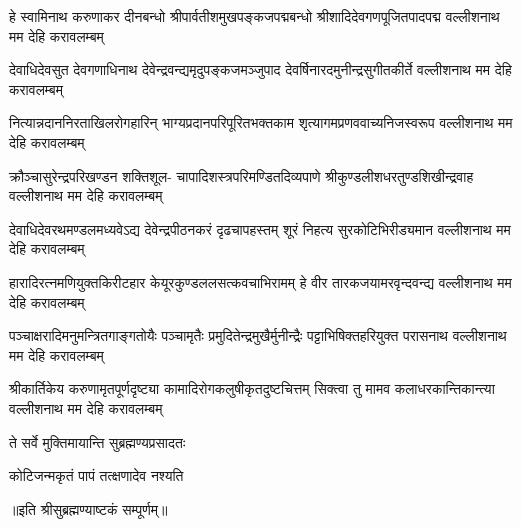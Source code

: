 

\fourlineindentedshloka
{हे स्वामिनाथ करुणाकर दीनबन्धो}
{श्रीपार्वतीशमुखपङ्कजपद्मबन्धो}
{श्रीशादिदेवगणपूजितपादपद्म}
{वल्लीशनाथ मम देहि करावलम्बम्} %

\fourlineindentedshloka
{देवाधिदेवसुत देवगणाधिनाथ}
{देवेन्द्रवन्द्यमृदुपङ्कजमञ्जुपाद}
{देवर्षिनारदमुनीन्द्रसुगीतकीर्ते}
{वल्लीशनाथ मम देहि करावलम्बम्} %

\fourlineindentedshloka
{नित्यान्नदाननिरताखिलरोगहारिन्}
{भाग्यप्रदानपरिपूरितभक्तकाम}
{श‍ृत्यागमप्रणववाच्यनिजस्वरूप}
{वल्लीशनाथ मम देहि करावलम्बम्} %

\fourlineindentedshloka
{क्रौञ्चासुरेन्द्रपरिखण्डन शक्तिशूल-}
{चापादिशस्त्रपरिमण्डितदिव्यपाणे}
{श्रीकुण्डलीशधरतुण्डशिखीन्द्रवाह }
{वल्लीशनाथ मम देहि करावलम्बम्} %

\fourlineindentedshloka
{देवाधिदेवरथमण्डलमध्यवेऽद्य}
{देवेन्द्रपीठनकरं दृढचापहस्तम्}
{शूरं निहत्य सुरकोटिभिरीड्यमान}
{वल्लीशनाथ मम देहि करावलम्बम्} %

\fourlineindentedshloka
{हारादिरत्नमणियुक्तकिरीटहार}
{केयूरकुण्डललसत्कवचाभिरामम्}
{हे वीर तारकजयामरवृन्दवन्द्य}
{वल्लीशनाथ मम देहि करावलम्बम्} %

\fourlineindentedshloka
{पञ्चाक्षरादिमनुमन्त्रितगाङ्गतोयैः}
{पञ्चामृतैः प्रमुदितेन्द्रमुखैर्मुनीन्द्रैः}
{पट्टाभिषिक्तहरियुक्त परासनाथ}
{वल्लीशनाथ मम देहि करावलम्बम्} %

\fourlineindentedshloka
{श्रीकार्तिकेय करुणामृतपूर्णदृष्ट्या}
{कामादिरोगकलुषीकृतदुष्टचित्तम्}
{सिक्त्वा तु मामव कलाधरकान्तिकान्त्या}
{वल्लीशनाथ मम देहि करावलम्बम्} %

{ते सर्वे मुक्तिमायान्ति सुब्रह्मण्यप्रसादतः}

{कोटिजन्मकृतं पापं तत्क्षणादेव नश्यति}

॥इति श्रीसुब्रह्मण्याष्टकं सम्पूर्णम्॥
